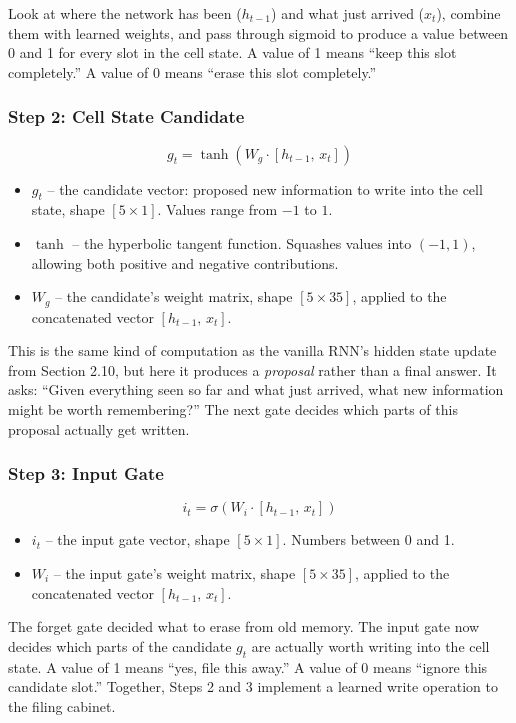 Look at where the network has been ($h_{t-1}$) and what just arrived ($x_t$),
combine them with learned weights, and pass through sigmoid to produce a value
between 0 and 1 for every slot in the cell state. A value of 1 means ``keep this
slot completely.'' A value of 0 means ``erase this slot completely.''

\subsubsection{Step 2: Cell State Candidate}

\[
g_t = \tanh(W_g \cdot [h_{t-1},\, x_t])
\]

\begin{itemize}
    \item $g_t$ -- the candidate vector: proposed new information to write into the
    cell state, shape $[5 \times 1]$. Values range from $-1$ to $1$.
    \item $\tanh$ -- the hyperbolic tangent function. Squashes values into
    $(-1, 1)$, allowing both positive and negative contributions.
    \item $W_g$ -- the candidate's weight matrix, shape $[5 \times 35]$, applied to
    the concatenated vector $[h_{t-1},\, x_t]$.
\end{itemize}

This is the same kind of computation as the vanilla RNN's hidden state update from
Section 2.10, but here it produces a \textit{proposal} rather than a final answer.
It asks: ``Given everything seen so far and what just arrived, what new information
might be worth remembering?'' The next gate decides which parts of this proposal
actually get written.

\subsubsection{Step 3: Input Gate}

\[
i_t = \sigma(W_i \cdot [h_{t-1},\, x_t])
\]

\begin{itemize}
    \item $i_t$ -- the input gate vector, shape $[5 \times 1]$. Numbers between
    0 and 1.
    \item $W_i$ -- the input gate's weight matrix, shape $[5 \times 35]$, applied to
    the concatenated vector $[h_{t-1},\, x_t]$.
\end{itemize}

The forget gate decided what to erase from old memory. The input gate now decides
which parts of the candidate $g_t$ are actually worth writing into the cell state.
A value of 1 means ``yes, file this away.'' A value of 0 means ``ignore this
candidate slot.'' Together, Steps 2 and 3 implement a learned write operation to the
filing cabinet.

